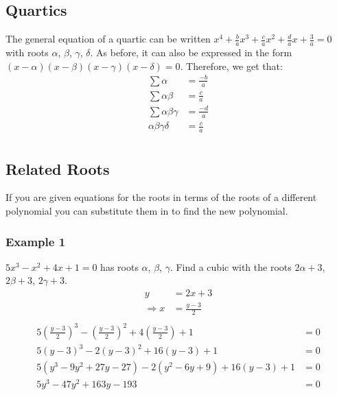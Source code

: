 \documentclass[class=article, crop=false]{standalone}
\begin{document}
\subsection*{Quartics}
The general equation of a quartic can be written $x^4 + \frac{b}{a} x^3 + \frac{c}{a} x^2 + \frac{d}{a} x + \frac{3}{a} = 0$ with roots $\alpha$, $\beta$, $\gamma$, $\delta$. As before, it can also be expressed in the form $(x-\alpha)(x-\beta)(x-\gamma)(x-\delta)=0$. Therefore, we get that:
\begin{align*}
\sum \alpha & = \frac{-b}{a} \\
\sum \alpha \beta & = \frac{c}{a} \\
\sum \alpha \beta \gamma & = \frac{-d}{a} \\
\alpha \beta \gamma \delta & = \frac{c}{a} \\
\end{align*}

\subsection*{Related Roots}
If you are given equations for the roots in terms of the roots of a different polynomial you can substitute them in to find the new polynomial. \\

\subsubsection*{Example 1}
$5x^3 - x^2 + 4x + 1 = 0$ has roots $\alpha$, $\beta$, $\gamma$. Find a cubic with the roots $2 \alpha + 3$, $2 \beta + 3$, $2 \gamma + 3$. \\

\begin{align*}
y & = 2x+3 \\
\Rightarrow x & = \frac{y-3}{2} \\
\end{align*}
\begin{align*}
5(\frac{y-3}{2})^3 - (\frac{y-3}{2})^2 + 4(\frac{y-3}{2}) + 1 & = 0 \\
5(y-3)^3 - 2(y-3)^2 + 16(y-3) +1 & = 0 \\
5(y^3 -9y^2 + 27y -27) -2(y^2 -6y +9) + 16(y-3) +1 & = 0 \\
5y^3 - 47y^2 + 163y -193 & = 0 \\
\end{align*}
\end{document}
